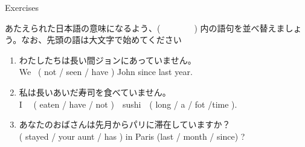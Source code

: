 \documentclass[aspectratio=169,xcolor={dvipsnames,table}]{beamer}
\newcommand{\myaudio}[1]{\href{#1}{\faVolumeUp}}
\begin{document}
\begin{frame}[plain]{Exercises}
 
あたえられた日本語の意味になるよう、(~~~~~~~~) 内の語句を並べ替えましょう。なお、先頭の語は大文字で始めてください\mbox{}\hfill\myaudio{./audio/012_have_pp_keizoku_09.mp3}


\begin{enumerate}
 \item わたしたちは長い間ジョンにあっていません。\\
We  ~( not / seen / have ) John since last year.\\
 \item  私は長いあいだ寿司を食べていません。\\
I ~~( eaten /  have / not )~~sushi~~( long / a / fot /time ).\\
 \item  あなたのおばさんは先月からパリに滞在していますか？\bcdfrance\\
( stayed /  your aunt / has ) in Paris (last / month / since) ? \\
\end{enumerate}
\end{frame}
\end{document}
